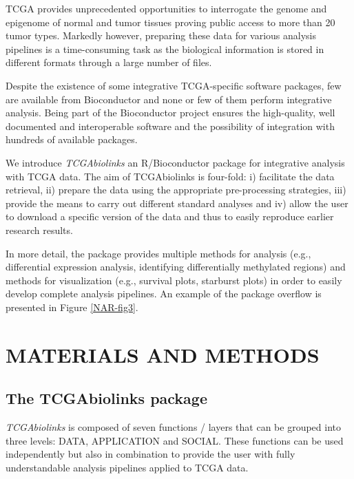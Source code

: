 TCGA provides unprecedented opportunities to interrogate the genome and epigenome of normal and tumor tissues proving public access to more than 20 tumor types. Markedly however, preparing these data for various  analysis pipelines 
is a time-consuming task as the biological information is stored in different formats through a large number of files.

Despite the existence of some integrative TCGA-specific software packages, few are available from Bioconductor and none or few of them perform integrative analysis. 
Being part of the Bioconductor project ensures the high-quality, well documented and interoperable software and the possibility of integration with hundreds of available packages.


We introduce \textit{TCGAbiolinks} an R/Bioconductor package for integrative analysis with TCGA data.
The aim of TCGAbiolinks is four-fold: i) facilitate the data retrieval, ii) prepare the data using the appropriate pre-processing strategies, iii) provide the means to carry out different standard analyses and iv) allow the user to download a specific version of the data and thus to easily reproduce earlier research results.

In more detail, the package provides multiple methods for analysis (e.g., differential expression analysis, identifying differentially methylated regions) and methods for visualization (e.g., survival plots, starburst plots) in order to easily develop complete analysis pipelines. An example of the package overflow is presented in Figure \ref{NAR-fig3}. %







\section{MATERIALS AND METHODS}
\subsection{The TCGAbiolinks package}

\textit{TCGAbiolinks} is composed of seven functions / layers that can be grouped into three levels: DATA, APPLICATION and SOCIAL.
These functions can be used independently but also in combination to provide the user with fully understandable analysis pipelines applied to TCGA data.

